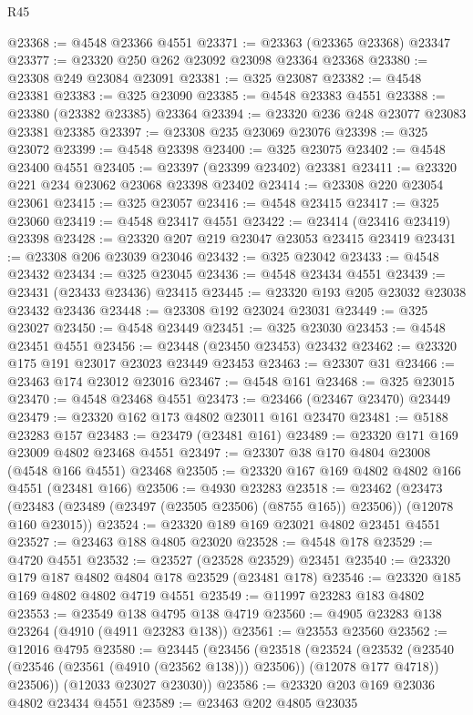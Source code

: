 \begin{lexlean}{R45}
\begin{coremodule}
@23368 := @4548 @23366 @4551
@23371 := @23363 (@23365 @23368) @23347
@23377 := @23320 @250 @262 @23092 @23098 @23364 @23368
@23380 := @23308 @249 @23084 @23091
@23381 := @325 @23087
@23382 := @4548 @23381
@23383 := @325 @23090
@23385 := @4548 @23383 @4551
@23388 := @23380 (@23382 @23385) @23364
@23394 := @23320 @236 @248 @23077 @23083 @23381 @23385
@23397 := @23308 @235 @23069 @23076
@23398 := @325 @23072
@23399 := @4548 @23398
@23400 := @325 @23075
@23402 := @4548 @23400 @4551
@23405 := @23397 (@23399 @23402) @23381
@23411 := @23320 @221 @234 @23062 @23068 @23398 @23402
@23414 := @23308 @220 @23054 @23061
@23415 := @325 @23057
@23416 := @4548 @23415
@23417 := @325 @23060
@23419 := @4548 @23417 @4551
@23422 := @23414 (@23416 @23419) @23398
@23428 := @23320 @207 @219 @23047 @23053 @23415 @23419
@23431 := @23308 @206 @23039 @23046
@23432 := @325 @23042
@23433 := @4548 @23432
@23434 := @325 @23045
@23436 := @4548 @23434 @4551
@23439 := @23431 (@23433 @23436) @23415
@23445 := @23320 @193 @205 @23032 @23038 @23432 @23436
@23448 := @23308 @192 @23024 @23031
@23449 := @325 @23027
@23450 := @4548 @23449
@23451 := @325 @23030
@23453 := @4548 @23451 @4551
@23456 := @23448 (@23450 @23453) @23432
@23462 := @23320 @175 @191 @23017 @23023 @23449 @23453
@23463 := @23307 @31
@23466 := @23463 @174 @23012 @23016
@23467 := @4548 @161
@23468 := @325 @23015
@23470 := @4548 @23468 @4551
@23473 := @23466 (@23467 @23470) @23449
@23479 := @23320 @162 @173 @4802 @23011 @161 @23470
@23481 := @5188 @23283 @157
@23483 := @23479 (@23481 @161)
@23489 := @23320 @171 @169 @23009 @4802 @23468 @4551
@23497 := @23307 @38 @170 @4804 @23008 (@4548 @166 @4551) @23468
@23505 := @23320 @167 @169 @4802 @4802 @166 @4551 (@23481 @166)
@23506 := @4930 @23283
@23518 := @23462
    (@23473 (@23483 (@23489 (@23497 (@23505 @23506) (@8755 @165)) @23506)) (@12078 @160 @23015))
@23524 := @23320 @189 @169 @23021 @4802 @23451 @4551
@23527 := @23463 @188 @4805 @23020
@23528 := @4548 @178
@23529 := @4720 @4551
@23532 := @23527 (@23528 @23529) @23451
@23540 := @23320 @179 @187 @4802 @4804 @178 @23529 (@23481 @178)
@23546 := @23320 @185 @169 @4802 @4802 @4719 @4551
@23549 := @11997 @23283 @183 @4802
@23553 := @23549 @138 @4795 @138 @4719
@23560 := @4905 @23283 @138 @23264 (@4910 (@4911 @23283 @138))
@23561 := @23553 @23560
@23562 := @12016 @4795
@23580 := @23445
    (@23456
      (@23518
        (@23524
          (@23532 (@23540 (@23546 (@23561 (@4910 (@23562 @138))) @23506)) (@12078 @177 @4718))
          @23506))
      (@12033 @23027 @23030))
@23586 := @23320 @203 @169 @23036 @4802 @23434 @4551
@23589 := @23463 @202 @4805 @23035

\end{coremodule}
\end{lexlean}
